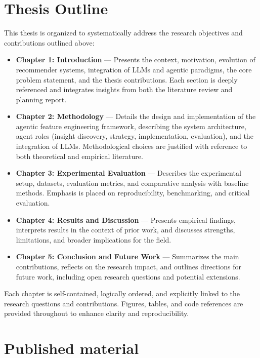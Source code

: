 
\section{Thesis Outline}
This thesis is organized to systematically address the research objectives and contributions outlined above:
\begin{itemize}
    \item \textbf{Chapter 1: Introduction} — Presents the context, motivation, evolution of recommender systems, integration of LLMs and agentic paradigms, the core problem statement, and the thesis contributions. Each section is deeply referenced and integrates insights from both the literature review and planning report.
    \item \textbf{Chapter 2: Methodology} — Details the design and implementation of the agentic feature engineering framework, describing the system architecture, agent roles (insight discovery, strategy, implementation, evaluation), and the integration of LLMs. Methodological choices are justified with reference to both theoretical and empirical literature.
    \item \textbf{Chapter 3: Experimental Evaluation} — Describes the experimental setup, datasets, evaluation metrics, and comparative analysis with baseline methods. Emphasis is placed on reproducibility, benchmarking, and critical evaluation.
    \item \textbf{Chapter 4: Results and Discussion} — Presents empirical findings, interprets results in the context of prior work, and discusses strengths, limitations, and broader implications for the field.
    \item \textbf{Chapter 5: Conclusion and Future Work} — Summarizes the main contributions, reflects on the research impact, and outlines directions for future work, including open research questions and potential extensions.
\end{itemize}

Each chapter is self-contained, logically ordered, and explicitly linked to the research questions and contributions. Figures, tables, and code references are provided throughout to enhance clarity and reproducibility.


\section{Published material}

\kant[1]
